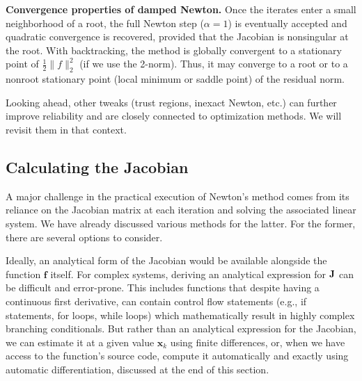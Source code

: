 
\textbf{Convergence properties of damped Newton.}
Once the iterates enter a small neighborhood of a root, the full Newton step ($\alpha=1$) is eventually accepted and quadratic convergence is recovered, provided that the Jacobian is nonsingular at the root. With backtracking, the method is globally convergent to a stationary point of $\tfrac12\|f\|_2^2$ (if we use the 2-norm). Thus, it may converge to a root or to a nonroot stationary point (local minimum or saddle point) of the residual norm.

Looking ahead, other tweaks (trust regions, inexact Newton, etc.) can further improve reliability and are closely connected to optimization methods. We will revisit them in that context.



\subsection{Calculating the Jacobian} 
A major challenge in the practical execution of Newton's method comes from its reliance on the Jacobian matrix at each iteration and solving the associated linear system. We have already discussed various methods for the latter. For the former, there are several options to consider. 

Ideally, an analytical form of the Jacobian would be available alongside the function $\mathbf f$ itself. For complex systems, deriving an analytical expression for \(\mathbf{J}\) can be difficult and error-prone. This includes functions that despite having a continuous first derivative, can contain control flow statements (e.g., if statements, for loops, while loops) which mathematically result in highly complex branching conditionals. But rather than an analytical expression for the Jacobian, we can estimate it at a given value $\mathbf x_k$ using finite differences, or, when we have access to the function's source code, compute it automatically and exactly using automatic differentiation, discussed at the end of this section.

